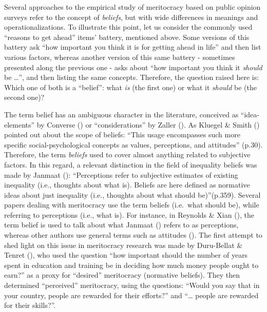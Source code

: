 \documentclass[
  10pt,
  a4paper,
]{article}
\begin{document}
Several approaches to the empirical study of meritocracy based on public opinion surveys refer to the concept of \emph{beliefs}, but with wide differences in meanings and operationalizations. To illustrate this point, let us consider the commonly used ``reasons to get ahead'' items' battery, mentioned above. Some versions of this battery ask ``how important you think it is for getting ahead in life'' and then list various factors, whereas another version of this same battery - sometimes presented along the previous one - asks about ``how important you think it \emph{should} be \ldots{}'', and then listing the same concepts. Therefore, the question raised here is: Which one of both is a ``belief'': what \emph{is} (the first one) or what it \emph{should} be (the second one)?

The term belief has an ambiguous character in the literature, conceived as ``idea-elements'' by Converse () or ``considerations'' by Zaller (). As Kluegel \& Smith () pointed out about the scope of beliefs: ``This usage encompasses such more specific social-psychological concepts as values, perceptions, and attitudes'' (p.30). Therefore, the term \emph{beliefs} used to cover almost anything related to subjective factors. In this regard, a relevant distinction in the field of inequality beliefs was made by Janmaat (): ``Perceptions refer to subjective estimates of existing inequality (i.e., thoughts about what is). Beliefs are here defined as normative ideas about just inequality (i.e., thoughts about what should be)''(p.359). Several papers dealing with meritocracy use the term beliefs (i.e.~what should be), while referring to perceptions (i.e., what is). For instance, in Reynolds \& Xian (), the term belief is used to talk about what Janmaat () refers to as perceptions, whereas other authors use general terms such as attitudes (). The first attempt to shed light on this issue in meritocracy research was made by Duru-Bellat \& Tenret (), who used the question ``how important should the number of years spent in education and training be in deciding how much money people ought to earn?'' as a proxy for ``desired'' meritocracy (normative beliefs). They then determined ``perceived'' meritocracy, using the questions: ``Would you say that in your country, people are rewarded for their efforts?'' and ``\ldots{} people are rewarded for their skills?''.
\end{document}
